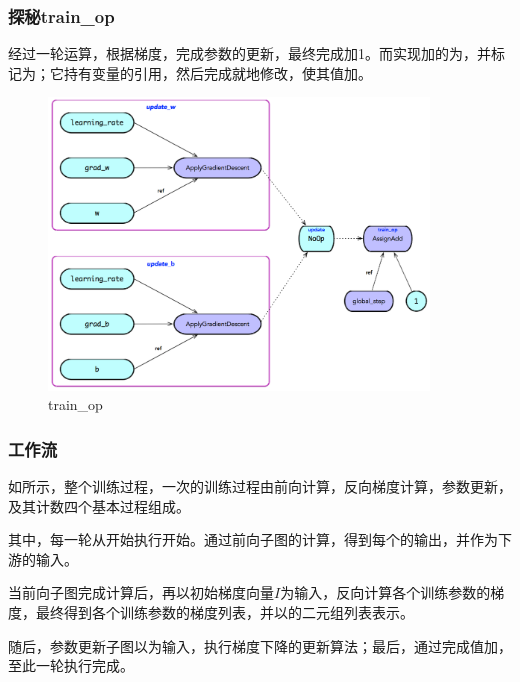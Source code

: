 \begin{content}
\subsubsection{探秘train\_op}

经过一轮运算，根据梯度，完成参数的更新，最终完成加1。而实现加的为，并标记为；它持有变量的引用，然后完成就地修改，使其值加。

\begin{figure}[!h]
\centering
\includegraphics[width=0.9\textwidth]{figures/bp-train-op.png}
\caption{train\_op}
 \label{fig:bp-train-op}
\end{figure}

\subsubsection{工作流}

如所示，整个训练过程，一次的训练过程由前向计算，反向梯度计算，参数更新，及其计数四个基本过程组成。

其中，每一轮从开始执行开始。通过前向子图的计算，得到每个的输出，并作为下游的输入。

当前向子图完成计算后，再以初始梯度向量$ I $为输入，反向计算各个训练参数的梯度，最终得到各个训练参数的梯度列表，并以的二元组列表表示。

随后，参数更新子图以为输入，执行梯度下降的更新算法；最后，通过完成值加，至此一轮执行完成。


\end{content}
